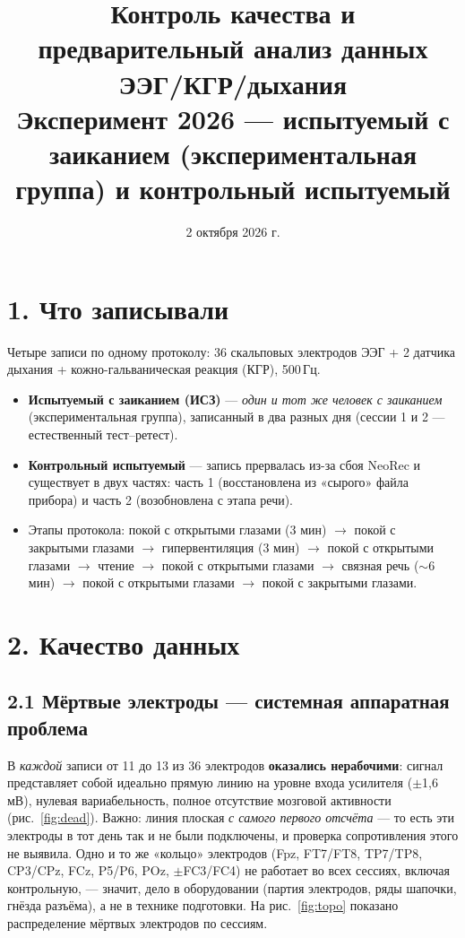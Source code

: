 \documentclass[11pt,a4paper]{article}
\title{\textbf{Контроль качества и предварительный анализ данных ЭЭГ/КГР/дыхания}\\[6pt]
\large Эксперимент 2026 --- испытуемый с заиканием (экспериментальная группа) и контрольный испытуемый}
\author{}
\date{2 октября 2026 г.}
\begin{document}
\maketitle
\vspace{-2.5cm}

\section*{1. Что записывали}
Четыре записи по одному протоколу: 36 скальповых электродов ЭЭГ + 2 датчика дыхания +
кожно-гальваническая реакция (КГР), 500\,Гц.
\begin{itemize}\setlength\itemsep{1pt}
\item \textbf{Испытуемый с заиканием (ИСЗ)} --- \emph{один и тот же человек с
заиканием} (экспериментальная группа), записанный в два разных дня (сессии 1 и 2 --- естественный тест--ретест).
\item \textbf{Контрольный испытуемый} --- запись прервалась из-за сбоя
NeoRec и существует в двух частях: часть 1 (восстановлена из «сырого» файла прибора) и часть 2
(возобновлена с этапа речи).
\item Этапы протокола: покой с открытыми глазами (3 мин) $\rightarrow$ покой с закрытыми глазами
$\rightarrow$ гипервентиляция (3 мин) $\rightarrow$ покой с открытыми глазами $\rightarrow$ чтение
$\rightarrow$ покой с открытыми глазами $\rightarrow$ связная речь ($\sim$6 мин) $\rightarrow$ покой
с открытыми глазами $\rightarrow$ покой с закрытыми глазами.
\end{itemize}

\section*{2. Качество данных}

\subsection*{2.1 Мёртвые электроды --- системная аппаратная проблема}
В \emph{каждой} записи от 11 до 13 из 36 электродов \textbf{оказались нерабочими}: сигнал
представляет собой идеально прямую линию на уровне входа усилителя ($\pm$1,6\,мВ), нулевая
вариабельность, полное отсутствие мозговой активности (рис.~\ref{fig:dead}). Важно: линия плоская
\emph{с самого первого отсчёта} --- то есть эти электроды в тот день так и не были подключены,
и проверка сопротивления этого не выявила. Одно и то же «кольцо» электродов (Fpz, FT7/FT8, TP7/TP8,
CP3/CPz, FCz, P5/P6, POz, $\pm$FC3/FC4) не работает во всех сессиях, включая контрольную, --- значит, дело
в оборудовании (партия электродов, ряды шапочки, гнёзда разъёма), а не в технике подготовки. На рис.~\ref{fig:topo} показано распределение мёртвых электродов
по сессиям.
\end{document}
